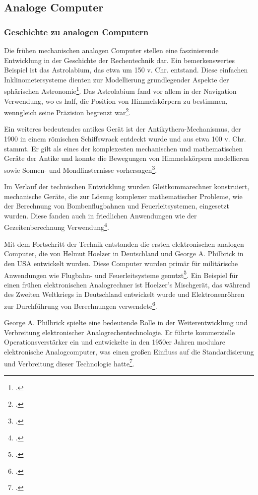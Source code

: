 \subsection{Analoge Computer}

\subsubsection{Geschichte zu analogen Computern}

Die frühen mechanischen analogen Computer stellen eine faszinierende Entwicklung in der Geschichte der Rechentechnik dar. Ein bemerkenswertes Beispiel ist das Astrolabium, das etwa um 150 v. Chr. entstand. Diese einfachen Inklinometersysteme dienten zur Modellierung grundlegender Aspekte der sphärischen Astronomie\footcite[Vgl. ][9]{ulmann2022analog}. Das Astrolabium fand vor allem in der Navigation Verwendung, wo es half, die Position von Himmelskörpern zu bestimmen, wenngleich seine Präzision begrenzt war\footcite[Vgl. ][9]{ulmann2022analog}.

Ein weiteres bedeutendes antikes Gerät ist der Antikythera-Mechanismus, der 1900 in einem römischen Schiffswrack entdeckt wurde und aus etwa 100 v. Chr. stammt. Er gilt als eines der komplexesten mechanischen und mathematischen Geräte der Antike und konnte die Bewegungen von Himmelskörpern modellieren sowie Sonnen- und Mondfinsternisse vorhersagen\footcite[Vgl. ][9-10]{ulmann2022analog}.

Im Verlauf der technischen Entwicklung wurden Gleitkommarechner konstruiert, mechanische Geräte, die zur Lösung komplexer mathematischer Probleme, wie der Berechnung von Bombenflugbahnen und Feuerleitsystemen, eingesetzt wurden. Diese fanden auch in friedlichen Anwendungen wie der Gezeitenberechnung Verwendung\footcite[Vgl. ][9]{ulmann2022analog}.

Mit dem Fortschritt der Technik entstanden die ersten elektronischen analogen Computer, die von Helmut Hoelzer in Deutschland und George A. Philbrick in den USA entwickelt wurden. Diese Computer wurden primär für militärische Anwendungen wie Flugbahn- und Feuerleitsysteme genutzt\footcite[Vgl. ][41]{ulmann2022analog}. Ein Beispiel für einen frühen elektronischen Analogrechner ist Hoelzer’s Mischgerät, das während des Zweiten Weltkriegs in Deutschland entwickelt wurde und Elektronenröhren zur Durchführung von Berechnungen verwendete\footcite[Vgl. ][42]{ulmann2022analog}.

George A. Philbrick spielte eine bedeutende Rolle in der Weiterentwicklung und Verbreitung elektronischer Analogrechentechnologie. Er führte kommerzielle Operationsverstärker ein und entwickelte in den 1950er Jahren modulare elektronische Analogcomputer, was einen großen Einfluss auf die Standardisierung und Verbreitung dieser Technologie hatte\footcite[Vgl. ][136]{ulmann2022analog}.

